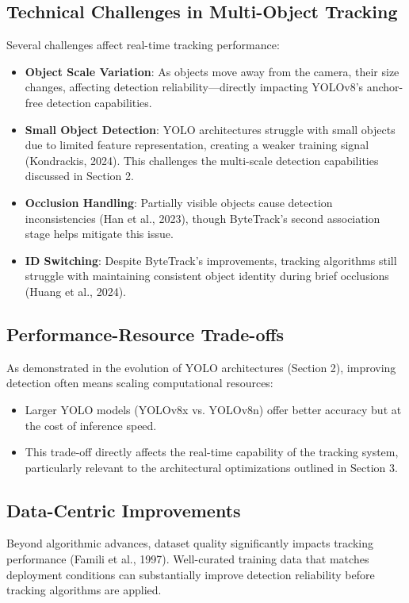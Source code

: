\documentclass[11pt]{article}
\begin{document}
\subsection{Technical Challenges in Multi-Object Tracking}
Several challenges affect real-time tracking performance:

\begin{itemize}
    \item \textbf{Object Scale Variation}: As objects move away from the camera, their size changes, affecting detection reliability—directly impacting YOLOv8's anchor-free detection capabilities.
    
    \item \textbf{Small Object Detection}: YOLO architectures struggle with small objects due to limited feature representation, creating a weaker training signal (Kondrackis, 2024). This challenges the multi-scale detection capabilities discussed in Section 2.
    
    \item \textbf{Occlusion Handling}: Partially visible objects cause detection inconsistencies (Han et al., 2023), though ByteTrack's second association stage helps mitigate this issue.
    
    \item \textbf{ID Switching}: Despite ByteTrack's improvements, tracking algorithms still struggle with maintaining consistent object identity during brief occlusions (Huang et al., 2024).
\end{itemize}

\subsection{Performance-Resource Trade-offs}
As demonstrated in the evolution of YOLO architectures (Section 2), improving detection often means scaling computational resources:

\begin{itemize}
    \item Larger YOLO models (YOLOv8x vs. YOLOv8n) offer better accuracy but at the cost of inference speed.
    \item This trade-off directly affects the real-time capability of the tracking system, particularly relevant to the architectural optimizations outlined in Section 3.
\end{itemize}

\subsection{Data-Centric Improvements}
Beyond algorithmic advances, dataset quality significantly impacts tracking performance (Famili et al., 1997). Well-curated training data that matches deployment conditions can substantially improve detection reliability before tracking algorithms are applied.
\end{document}
